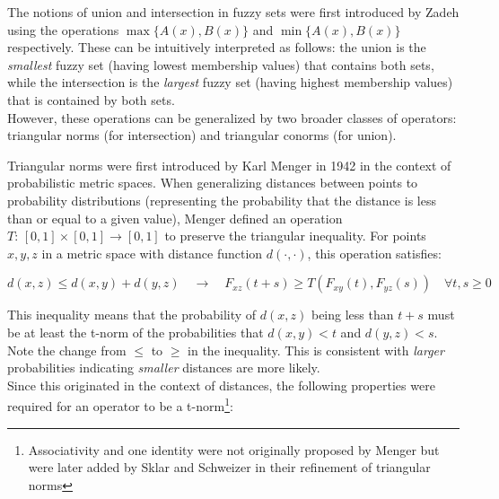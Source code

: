 
The notions of union and intersection in fuzzy sets were first introduced by Zadeh \cite{Zadeh1965} using the operations $\max\{A(x),B(x)\}$ and $\min\{A(x),B(x)\}$ respectively. These can be intuitively interpreted as follows: the union is the \textit{smallest} fuzzy set (having lowest membership values) that contains both sets, while the intersection is the \textit{largest} fuzzy set (having highest membership values) that is contained by both sets.\\

However, these operations can be generalized by two broader classes of operators: triangular norms (for intersection) and triangular conorms (for union).

Triangular norms were first introduced by Karl Menger in 1942 \cite{OriginTNorms} in the context of probabilistic metric spaces. When generalizing distances between points to probability distributions (representing the probability that the distance is less than or equal to a given value), Menger defined an operation $T:\,[0,1]\times [0,1]\to [0,1]$ to preserve the triangular inequality. For points $x,y,z$ in a metric space with distance function $d(\cdot,\cdot)$, this operation satisfies:

\begin{equation}\label{eq:Ftriangle_inequality}
d(x, z) \leq d(x, y) + d(y, z) \quad \longrightarrow \quad F_{xz}(t + s) \geq T(F_{xy}(t), F_{yz}(s)) \quad \forall t,s \geq 0
\end{equation}

This inequality means that the probability of $d(x,z)$ being less than $t+s$ must be at least the t-norm of the probabilities that $d(x,y)<t$ and $d(y,z)<s$. Note the change from $\leq$ to $\geq$ in the inequality. This is consistent with \textit{larger} probabilities indicating \textit{smaller} distances are more likely.\\

Since this originated in the context of distances, the following properties were required for an operator to be a t-norm\footnote{Associativity and one identity were not originally proposed by Menger but were later added by Sklar and Schweizer \cite{Sklar1983} in their refinement of triangular norms}:


